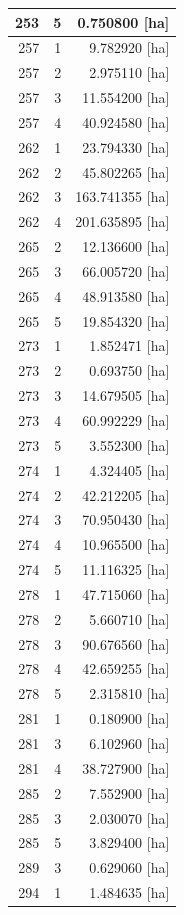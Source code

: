 \documentclass[11pt,]{book}
\begin{document}
\begin{table}
\begin{tabular}[t]{r|r|r}
\hline
253 & 5 & 0.750800 [ha]\\
\hline
257 & 1 & 9.782920 [ha]\\
\hline
257 & 2 & 2.975110 [ha]\\
\hline
257 & 3 & 11.554200 [ha]\\
\hline
257 & 4 & 40.924580 [ha]\\
\hline
262 & 1 & 23.794330 [ha]\\
\hline
262 & 2 & 45.802265 [ha]\\
\hline
262 & 3 & 163.741355 [ha]\\
\hline
262 & 4 & 201.635895 [ha]\\
\hline
265 & 2 & 12.136600 [ha]\\
\hline
265 & 3 & 66.005720 [ha]\\
\hline
265 & 4 & 48.913580 [ha]\\
\hline
265 & 5 & 19.854320 [ha]\\
\hline
273 & 1 & 1.852471 [ha]\\
\hline
273 & 2 & 0.693750 [ha]\\
\hline
273 & 3 & 14.679505 [ha]\\
\hline
273 & 4 & 60.992229 [ha]\\
\hline
273 & 5 & 3.552300 [ha]\\
\hline
274 & 1 & 4.324405 [ha]\\
\hline
274 & 2 & 42.212205 [ha]\\
\hline
274 & 3 & 70.950430 [ha]\\
\hline
274 & 4 & 10.965500 [ha]\\
\hline
274 & 5 & 11.116325 [ha]\\
\hline
278 & 1 & 47.715060 [ha]\\
\hline
278 & 2 & 5.660710 [ha]\\
\hline
278 & 3 & 90.676560 [ha]\\
\hline
278 & 4 & 42.659255 [ha]\\
\hline
278 & 5 & 2.315810 [ha]\\
\hline
281 & 1 & 0.180900 [ha]\\
\hline
281 & 3 & 6.102960 [ha]\\
\hline
281 & 4 & 38.727900 [ha]\\
\hline
285 & 2 & 7.552900 [ha]\\
\hline
285 & 3 & 2.030070 [ha]\\
\hline
285 & 5 & 3.829400 [ha]\\
\hline
289 & 3 & 0.629060 [ha]\\
\hline
294 & 1 & 1.484635 [ha]\\

\end{tabular}
\end{table}
\end{document}
